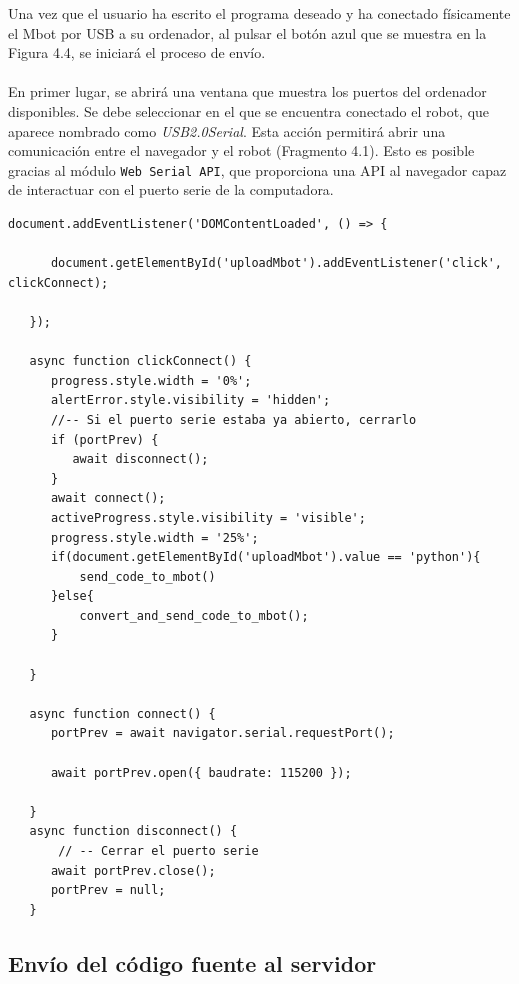 \documentclass{report}
\begin{document}
Una vez que el usuario ha escrito el programa deseado y ha conectado físicamente el Mbot por USB a su ordenador, al pulsar el botón azul que se muestra en la Figura 4.4, se iniciará el proceso de envío.
\\
\\
En primer lugar, se abrirá una ventana que muestra los puertos del ordenador disponibles. Se debe seleccionar en el que se encuentra conectado el robot, que aparece nombrado como \textit{USB2.0Serial}. Esta acción permitirá abrir una comunicación entre el navegador y el robot (Fragmento 4.1). Esto es posible gracias al módulo \texttt{Web Serial API}, que proporciona una API al navegador capaz de interactuar con el puerto serie de la computadora.
\\
\begin{lstlisting}[frame=single,breaklines=true, label=Abrir conexión con el Mbot desde el navegador web por el puerto serie, caption=Abrir conexión con el Mbot desde el navegador web por el puerto serie, captionpos=b]  % Inicia el bloque de código
   document.addEventListener('DOMContentLoaded', () => {

      document.getElementById('uploadMbot').addEventListener('click', clickConnect);

   });

   async function clickConnect() {
      progress.style.width = '0%';
      alertError.style.visibility = 'hidden';
      //-- Si el puerto serie estaba ya abierto, cerrarlo
      if (portPrev) {
         await disconnect();
      }
      await connect();
      activeProgress.style.visibility = 'visible';
      progress.style.width = '25%';
      if(document.getElementById('uploadMbot').value == 'python'){
          send_code_to_mbot()
      }else{
          convert_and_send_code_to_mbot();
      }

   }

   async function connect() {
      portPrev = await navigator.serial.requestPort();

      await portPrev.open({ baudrate: 115200 });

   }
   async function disconnect() {
       // -- Cerrar el puerto serie
      await portPrev.close();
      portPrev = null;
   }
\end{lstlisting}


\subsection{Envío del código fuente al servidor}
\end{document}
